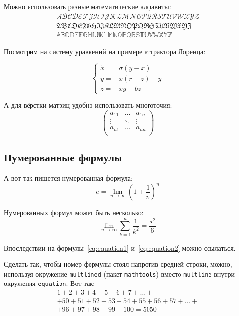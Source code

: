 Можно использовать разные математические алфавиты:
\begin{align}
\mathcal{ABCDEFGHIJKLMNOPQRSTUVWXYZ} \nonumber \\
\mathfrak{ABCDEFGHIJKLMNOPQRSTUVWXYZ} \nonumber \\
\mathbb{ABCDEFGHIJKLMNOPQRSTUVWXYZ} \nonumber
\end{align}

Посмотрим на систему уравнений на примере аттрактора Лоренца:

\[
\left\{
  \begin{array}{rl}
    \dot x = & \sigma (y-x) \\
    \dot y = & x (r - z) - y \\
    \dot z = & xy - bz
  \end{array}
\right.
\]

А для вёрстки матриц удобно использовать многоточия:
\[
\left(
  \begin{array}{ccc}
    a_{11} & \ldots & a_{1n} \\
    \vdots & \ddots & \vdots \\
    a_{n1} & \ldots & a_{nn} \\
  \end{array}
\right)
\]

\subsection{Нумерованные формулы}\label{subsec:ch1/sec3/sub3}

А вот так пишется нумерованная формула:
\begin{equation}
  \label{eq:equation1}
  e = \lim_{n \to \infty} \left( 1+\frac{1}{n} \right) ^n
\end{equation}

Нумерованных формул может быть несколько:
\begin{equation}
  \label{eq:equation2}
  \lim_{n \to \infty} \sum_{k=1}^n \frac{1}{k^2} = \frac{\pi^2}{6}
\end{equation}

Впоследствии на формулы~\eqref{eq:equation1} и~\eqref{eq:equation2} можно ссылаться.

Сделать так, чтобы номер формулы стоял напротив средней строки, можно,
используя окружение \verb|multlined| (пакет \verb|mathtools|) вместо
\verb|multline| внутри окружения \verb|equation|. Вот так:
\begin{equation} %
  \label{eq:equation3}
    \begin{multlined}
        1+ 2+3+4+5+6+7+\dots + \\
        + 50+51+52+53+54+55+56+57 + \dots + \\
        + 96+97+98+99+100=5050
    \end{multlined}
\end{equation}

